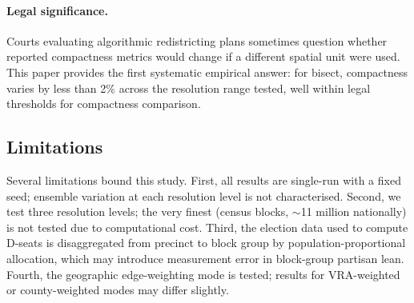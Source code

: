 \paragraph{Legal significance.}
Courts evaluating algorithmic redistricting plans sometimes question whether
reported compactness metrics would change if a different spatial unit were
used.  This paper provides the first systematic empirical answer: for bisect,
compactness varies by less than 2\% across the resolution range tested, well
within legal thresholds for compactness comparison.

\subsection{Limitations}

Several limitations bound this study.  First, all results are single-run with
a fixed seed; ensemble variation at each resolution level is not characterised.
Second, we test three resolution levels; the very finest (census blocks,
$\sim$11 million nationally) is not tested due to computational cost.
Third, the election data used to compute D-seats is disaggregated from
precinct to block group by population-proportional allocation, which may
introduce measurement error in block-group partisan lean.  Fourth, the
geographic edge-weighting mode is tested; results for VRA-weighted or
county-weighted modes may differ slightly.
